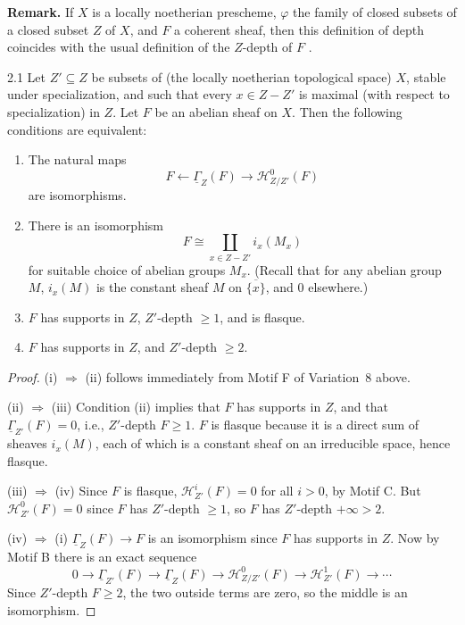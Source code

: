 \par\medskip\noindent\textbf{Remark.}
If $X$ is a locally noetherian prescheme, $\varphi$ the family of closed subsets of a closed subset $Z$ of $X$, and $F$ a coherent sheaf, then this definition of depth coincides with the usual definition of the $Z$-depth of $F$ \cite[]{LC}.
\par\medskip

\begin{bookproposition}{2.1}\label{prop:4.2.1}
Let $Z'\subseteq Z$ be subsets of (the locally noetherian topological space) $X$, stable under specialization, and such that every $x\in Z-Z'$ is maximal (with respect to specialization) in $Z$. Let $F$ be an abelian sheaf on $X$. Then the following conditions are equivalent:
\begin{enumerate}
\item[(i)] The natural maps
\[
F\longleftarrow \underline{\Gamma}_{Z}(F)\longrightarrow \mathcal{H}_{Z/Z'}^{0}(F)
\]
are isomorphisms.
\item[(ii)] There is an isomorphism
\[
F\cong \coprod_{x\in Z-Z'} i_x(M_x)
\]
for suitable choice of abelian groups $M_x$. (Recall that for any abelian group $M$, $i_x(M)$ is the constant sheaf $M$ on $\overline{\{x\}}$, and $0$ elsewhere.)
\item[(iii)] $F$ has supports in $Z$, $Z'$-depth $\geq 1$, and is flasque.
\item[(iv)] $F$ has supports in $Z$, and $Z'$-depth $\geq 2$.
\end{enumerate}
\end{bookproposition}

\begin{proof}
(i) $\Longrightarrow$ (ii) follows immediately from Motif F of Variation~8 above.

(ii) $\Longrightarrow$ (iii) Condition (ii) implies that $F$ has supports in $Z$, and that $\underline{\Gamma}_{Z'}(F)=0$, i.e., $Z'$-depth $F\geq 1$. $F$ is flasque because it is a direct sum of sheaves $i_x(M)$, each of which is a constant sheaf on an irreducible space, hence flasque.

(iii) $\Longrightarrow$ (iv) Since $F$ is flasque, $\mathcal{H}_{Z'}^{i}(F)=0$ for all $i>0$, by Motif C. But $\mathcal{H}_{Z'}^{0}(F)=0$ since $F$ has $Z'$-depth $\geq 1$, so $F$ has $Z'$-depth $+\infty > 2$.

(iv) $\Longrightarrow$ (i) $\underline{\Gamma}_Z(F)\to F$ is an isomorphism since $F$ has supports in $Z$. Now by Motif B there is an exact sequence
\[
0\longrightarrow \underline{\Gamma}_{Z'}(F)\longrightarrow \underline{\Gamma}_{Z}(F)\longrightarrow \mathcal{H}_{Z/Z'}^{0}(F)\longrightarrow \mathcal{H}_{Z'}^{1}(F)\longrightarrow\cdots
\]
Since $Z'$-depth $F\geq 2$, the two outside terms are zero, so the middle is an isomorphism.
\end{proof}

